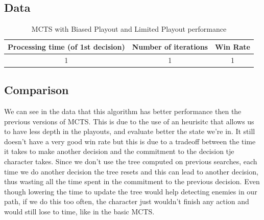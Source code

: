 \documentclass{article}
\begin{document}
  \subsection{Data}
  \begin{table}[h!]
    \centering
    \caption{MCTS with Biased Playout and Limited Playout performance}
    \label{tab:tableLimitedBiasedMCTS1}
    \begin{tabular}{c|c|c}
      \textbf{Processing time (of 1st decision)} & \textbf{Number of iterations} & \textbf{Win Rate}\\
      \hline
      1 & 1 & 1
    \end{tabular}
  \end{table}

  \subsection{Comparison}
  We can see in the data that this algorithm has better performance then the previous versions of MCTS. This is due to the use of an heurisitc that allows us to have less
  depth in the playouts, and evaluate better the state we're in. 
  It still doesn't have a very good win rate but this is due to a tradeoff between the time it takes to make another decision and the commitment to the decision tje
  character takes. Since we don't use the tree computed on previous searches, each time we do another decision the tree resets and this can lead to another decision,
  thus wasting all the time spent in the commitment to the previous decision. Even though lowering the time to update the tree would help detecting enemies in our path,
  if we do this too often, the character just wouldn't finish any action and would still lose to time, like in the basic MCTS.\\
\end{document}
